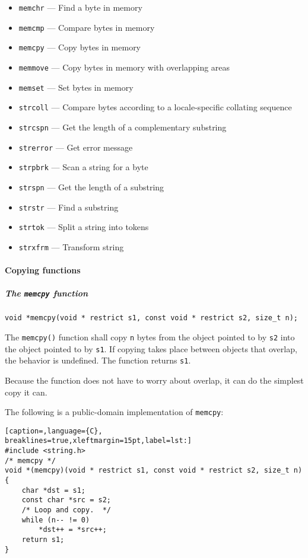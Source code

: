 \begin{itemize}
	\item \texttt{memchr} --- Find a byte in memory
	\item \texttt{memcmp} --- Compare bytes in memory
	\item \texttt{memcpy} --- Copy bytes in memory
	\item \texttt{memmove} --- Copy bytes in memory with overlapping areas
	\item \texttt{memset} --- Set bytes in memory
	\item \texttt{strcoll} --- Compare bytes according to a locale-specific collating sequence
	\item \texttt{strcspn} --- Get the length of a complementary substring
	\item \texttt{strerror} --- Get error message
	\item \texttt{strpbrk} --- Scan a string for a byte
	\item \texttt{strspn} --- Get the length of a substring
	\item \texttt{strstr} --- Find a substring
	\item \texttt{strtok} --- Split a string into tokens
	\item \texttt{strxfrm} --- Transform string
\end{itemize}

\paragraph{Copying functions}
\subparagraph{The \texttt{memcpy} function}
\texttt{void *memcpy(void * restrict s1, const void * restrict s2, size\_t n);}

The \texttt{memcpy()} function shall copy \texttt{n} bytes from the object
pointed to by \texttt{s2} into the object pointed to by \texttt{s1}. If copying
takes place between objects that overlap, the behavior is undefined. The
function returns \texttt{s1}.

Because the function does not have to worry about overlap, it can do the
simplest copy it can.

The following is a public-domain implementation of \texttt{memcpy}:
\lstset{basicstyle=\scriptsize, numbers=left, captionpos=b, tabsize=4}
\begin{lstlisting}[caption=,language={C},
breaklines=true,xleftmargin=15pt,label=lst:]
#include <string.h>
/* memcpy */
void *(memcpy)(void * restrict s1, const void * restrict s2, size_t n) {
	char *dst = s1;
	const char *src = s2;
	/* Loop and copy.  */
	while (n-- != 0)
		*dst++ = *src++;
	return s1;
}
\end{lstlisting}

